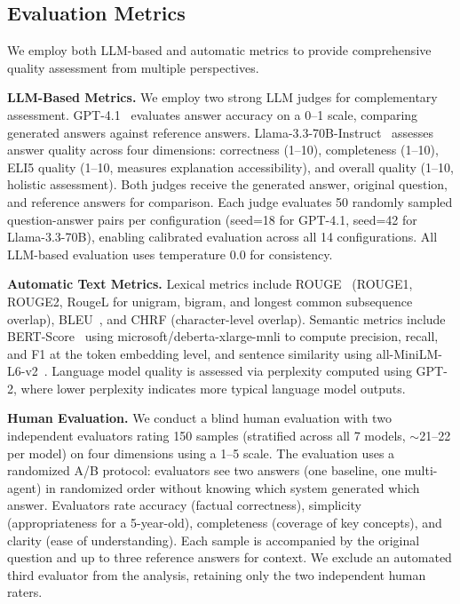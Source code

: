 \subsection{Evaluation Metrics}

We employ both LLM-based and automatic metrics to provide comprehensive quality assessment from multiple perspectives.

\textbf{LLM-Based Metrics.} We employ two strong LLM judges for complementary assessment. GPT-4.1~\cite{openai2024gpt4} evaluates answer accuracy on a 0--1 scale, comparing generated answers against reference answers. Llama-3.3-70B-Instruct~\cite{llama33} assesses answer quality across four dimensions: correctness (1--10), completeness (1--10), ELI5 quality (1--10, measures explanation accessibility), and overall quality (1--10, holistic assessment). Both judges receive the generated answer, original question, and reference answers for comparison. Each judge evaluates 50 randomly sampled question-answer pairs per configuration (seed=18 for GPT-4.1, seed=42 for Llama-3.3-70B), enabling calibrated evaluation across all 14 configurations. All LLM-based evaluation uses temperature 0.0 for consistency.

\textbf{Automatic Text Metrics.} Lexical metrics include ROUGE~\cite{lin2004rouge} (ROUGE1, ROUGE2, RougeL for unigram, bigram, and longest common subsequence overlap), BLEU~\cite{papineni2002bleu}, and CHRF (character-level overlap). Semantic metrics include BERT-Score~\cite{zhang2020bertscore} using microsoft/deberta-xlarge-mnli to compute precision, recall, and F1 at the token embedding level, and sentence similarity using all-MiniLM-L6-v2~\cite{reimers2019sentencebert}. Language model quality is assessed via perplexity computed using GPT-2, where lower perplexity indicates more typical language model outputs.

\textbf{Human Evaluation.} We conduct a blind human evaluation with two independent evaluators rating 150 samples (stratified across all 7 models, $\sim$21--22 per model) on four dimensions using a 1--5 scale. The evaluation uses a randomized A/B protocol: evaluators see two answers (one baseline, one multi-agent) in randomized order without knowing which system generated which answer. Evaluators rate accuracy (factual correctness), simplicity (appropriateness for a 5-year-old), completeness (coverage of key concepts), and clarity (ease of understanding). Each sample is accompanied by the original question and up to three reference answers for context. We exclude an automated third evaluator from the analysis, retaining only the two independent human raters.

